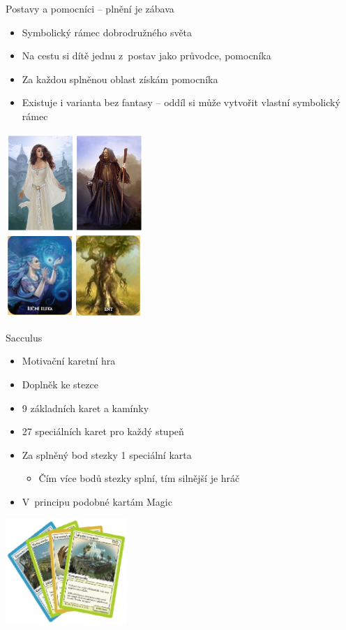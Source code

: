 \documentclass[compress,utf8,xcolor=dvipsnames]{beamer}
\begin{document}
\begin{frame}{Postavy a pomocníci -- plnění je zábava}
\begin{multicols}{2}
\begin{itemize}
\item Symbolický rámec dobrodružného světa
\item Na cestu si dítě jednu z~postav jako průvodce, pomocníka
\item Za každou splněnou oblast získám pomocníka
\item Existuje i varianta bez fantasy -- oddíl si může vytvořit vlastní symbolický rámec
\end{itemize}
\columnbreak
\includegraphics[height=7cm]{postavy.png}
\end{multicols}
\end{frame}

\begin{frame}{Sacculus}
\begin{multicols}{2}
\begin{itemize}
\item Motivační karetní hra
\item Doplněk ke stezce
\item 9 základních karet a kamínky
\item 27 speciálních karet pro každý stupeň
\item Za splněný bod stezky 1 speciální karta
\begin{itemize}
 \item Čím více bodů stezky splní, tím silnější je hráč
\end{itemize}
\item V~principu podobné kartám Magic
\end{itemize}
\columnbreak
\includegraphics[height=4cm]{sacculus.png}
\end{multicols}
\end{frame}
\end{document}
